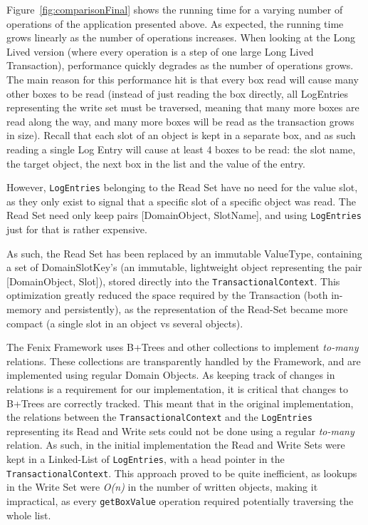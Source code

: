 \documentclass{llncs}
\begin{document}
Figure~\ref{fig:comparisonFinal} shows the running time for a varying
number of operations of the application presented above. As expected,
the running time grows linearly as the number of operations increases.
When looking at the Long Lived version (where every operation is a
step of one large Long Lived Transaction), performance quickly
degrades as the number of operations grows. The main reason for this
performance hit is that every box read will cause many other boxes to
be read (instead of just reading the box directly, all LogEntries
representing the write set must be traversed, meaning that many more
boxes are read along the way, and many more boxes will be read as the
transaction grows in size). Recall that each slot of an object is kept
in a separate box, and as such reading a single Log Entry will cause
at least 4 boxes to be read: the slot name, the target object, the
next box in the list and the value of the entry.

However, \texttt{LogEntries} belonging to the Read Set have no need
for the value slot, as they only exist to signal that a specific slot
of a specific object was read. The Read Set need only keep pairs
[DomainObject, SlotName], and using \texttt{LogEntries} just for that
is rather expensive.

As such, the Read Set has been replaced by an immutable ValueType,
containing a set of DomainSlotKey's (an immutable, lightweight object
representing the pair [DomainObject, Slot]), stored directly into the
\texttt{TransactionalContext}. This optimization greatly reduced the
space required by the Transaction (both in-memory and persistently),
as the representation of the Read-Set became more compact (a single
slot in an object vs several objects).

The Fenix Framework uses B+Trees and other collections to implement
{\it to-many} relations. These collections are transparently handled
by the Framework, and are implemented using regular Domain Objects. As
keeping track of changes in relations is a requirement for our
implementation, it is critical that changes to B+Trees are correctly
tracked. This meant that in the original implementation, the relations
between the \texttt{TransactionalContext} and the \texttt{LogEntries}
representing its Read and Write sets could not be done using a regular
{\it to-many} relation. As such, in the initial implementation the
Read and Write Sets were kept in a Linked-List of \texttt{LogEntries},
with a head pointer in the \texttt{TransactionalContext}.  This
approach proved to be quite inefficient, as lookups in the Write Set
were {\it O(n)} in the number of written objects, making it
impractical, as every \texttt{getBoxValue} operation required
potentially traversing the whole list.
\end{document}
